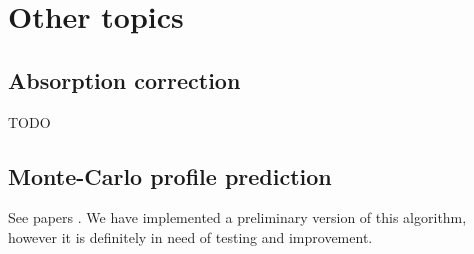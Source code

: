 \documentclass[11pt,a4paper]{article}
\begin{document}
\section{Other topics}

\subsection{Absorption correction}

TODO


\subsection{Monte-Carlo profile prediction}

See papers \cite{DuKS14,ScXK15}. We have implemented a preliminary version of this algorithm,
however it is definitely in need of testing and improvement.



\end{document}
